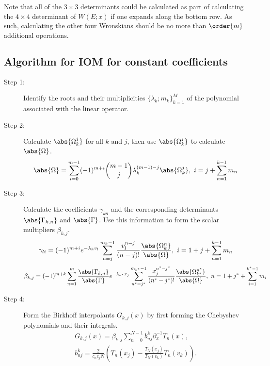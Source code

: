 \documentclass{article}
\begin{document}
Note that all of the $3 \times 3$ determinants could be calculated as part of calculating the $4 \times 4$ determinant of $W(E;x)$ if one expands along the bottom row.
As such, calculating the other four Wronskians should be no more than $\order{m}$ additional operations.

\subsection{Algorithm for IOM for constant coefficients}

\begin{description}
\item[Step 1:] Identify the roots and their multiplicities $\{ \lambda_k ; m_k \}_{k=1}^M$ of the polynomial associated with the linear operator.
\item[Step 2:] Calculate $\abs{\Omega_k^j}$ for all $k$ and $j$, then use $\abs{\Omega_k^j}$ to calculate $\abs{\Omega}$.
\begin{equation*}
\abs{\Omega} = \sum_{i=0}^{m-1} (-1)^{m+i} \binom{m-1}{j} \lambda_k^{(m-1)-j} \abs{\Omega_k^j}, \ i = j + \sum_{n=1}^{k-1} m_n
\end{equation*}
\item[Step 3:] Calculate the coefficients $\gamma_{kn}$ and the corresponding determinants $\abs{\Gamma_{k,n}}$ and $\abs{\Gamma}$. Use this information to form the scalar multipliers $\beta_{k,j}$.
\begin{equation*}
\gamma_{li} = (-1)^{m+i} e^{-\lambda_k v_l} \sum_{n=j}^{m_k-1} \frac{v_l^{n-j}}{(n-j)!} \frac{\abs{\Omega_k^n}}{\abs{\Omega}}, \ i = 1 + j + \sum_{n=1}^{k-1} m_n
\end{equation*}
\begin{equation*}
\beta_{k,j} = (-1)^{m+k} \sum_{n=1}^m \frac{\abs{\Gamma_{k,n}}}{\abs{\Gamma}} e^{-\lambda_{k^*} x_j} \sum_{n^*=j^*}^{m_{k^*}-1} \frac{x_j^{n^*-j^*}}{(n^*-j^*)!} \frac{\abs{\Omega_{k^*}^{n^*}}}{\abs{\Omega}}, \ n = 1 + j^* + \sum_{i=1}^{k^*-1} m_i
\end{equation*}
\item[Step 4:] Form the Birkhoff interpolants $G_{k,j}(x)$ by first forming the Chebyshev polynomials and their integrals.
\begin{equation*}
\begin{gathered}
G_{k,j} (x) = \beta_{k,j} \sum_{n=0}^{N-1} b^k_{nj} \partial_x^{-1} T_n(x), \\
 b^k_{nj} = \frac{2}{c_n c_j N} \left ( T_n(x_j) - \frac{T_N(x_j)}{T_N(v_k)} T_n(v_k) \right ).
\end{gathered}

\end{equation*}
\end{description}
\end{document}
